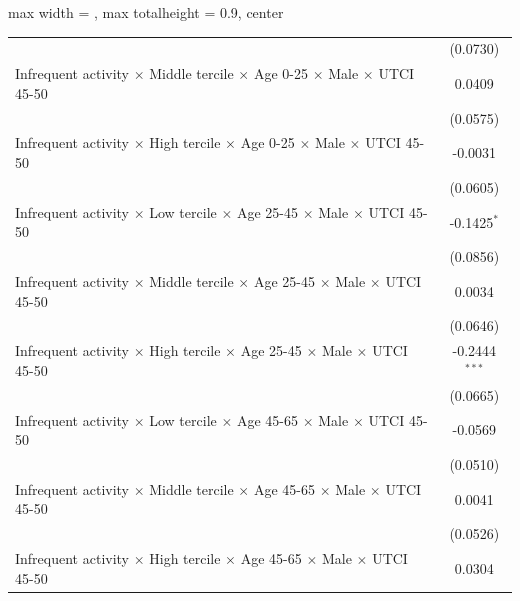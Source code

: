 \begin{table}[htbp]
\begin{adjustbox}{max width = \textwidth, max totalheight = 0.9\textheight, center}
\begin{tabular}{lc}
                                                                                                                 & (0.0730)\\   
         Infrequent activity $\times$ Middle tercile $\times$ Age 0-25 $\times$ Male $\times$ UTCI 45-50         & 0.0409\\   
                                                                                                                 & (0.0575)\\   
         Infrequent activity $\times$ High tercile $\times$ Age 0-25 $\times$ Male $\times$ UTCI 45-50           & -0.0031\\   
                                                                                                                 & (0.0605)\\   
         Infrequent activity $\times$ Low tercile $\times$ Age 25-45 $\times$ Male $\times$ UTCI 45-50           & -0.1425$^{*}$\\   
                                                                                                                 & (0.0856)\\   
         Infrequent activity $\times$ Middle tercile $\times$ Age 25-45 $\times$ Male $\times$ UTCI 45-50        & 0.0034\\   
                                                                                                                 & (0.0646)\\   
         Infrequent activity $\times$ High tercile $\times$ Age 25-45 $\times$ Male $\times$ UTCI 45-50          & -0.2444$^{***}$\\   
                                                                                                                 & (0.0665)\\   
         Infrequent activity $\times$ Low tercile $\times$ Age 45-65 $\times$ Male $\times$ UTCI 45-50           & -0.0569\\   
                                                                                                                 & (0.0510)\\   
         Infrequent activity $\times$ Middle tercile $\times$ Age 45-65 $\times$ Male $\times$ UTCI 45-50        & 0.0041\\   
                                                                                                                 & (0.0526)\\   
         Infrequent activity $\times$ High tercile $\times$ Age 45-65 $\times$ Male $\times$ UTCI 45-50          & 0.0304\\   

\end{tabular}
\end{adjustbox}
\end{table}
